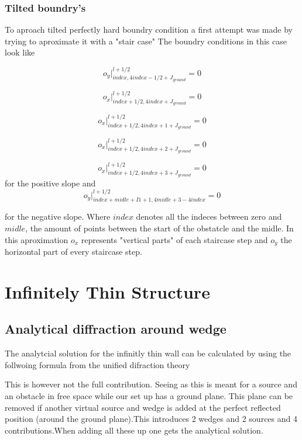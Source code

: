 \documentclass{article}
\begin{document}
\subsubsection{Tilted boundry's}

To aproach tilted perfectly hard boundry condition a first attempt was made by trying to aproximate it with a "stair case"
The boundry conditions in this case look like 

\begin{equation}
o_y|_{index,4index-1/2+J_{ground}}^{l+1/2}=0
\end{equation}

\begin{equation}
o_x|_{index+1/2,4index+J_{ground}}^{l+1/2}=0
\end{equation}

\begin{equation}
o_x|_{index+1/2,4index+1+J_{ground}}^{l+1/2}=0
\end{equation}

\begin{equation}
o_x|_{index+1/2,4index+2+J_{ground}}^{l+1/2}=0
\end{equation}

\begin{equation}
o_x|_{index+1/2,4index+3+J_{ground}}^{l+1/2}=0
\end{equation}
for the positive slope and 
\begin{equation}
    o_y|_{index+midle+I1+1,4midle+3-4index}^{l+1/2}=0
\end{equation}

for the negative slope. Where $index$ denotes all the indeces between zero and $midle$, the amount of points between the start of the obstatcle and the midle. In this aproximation $o_x$ represents "vertical parts" of each staircase step and $o_y$ the horizontal part of every staircase step.
\section{Infinitely Thin Structure}

\subsection{Analytical diffraction around wedge}
The analytcial solution for the infinitly thin wall can be calculated by using the follwoing formula from the unified difraction theory

\begin{equation}
    
\end{equation}
This is however not the full contribution. Seeing as this is meant for a source and an obstacle in free space while our set up has a ground plane. This plane can be removed if another virtual source and wedge is added at the perfect reflected position (around the ground plane).This introduces 2 wedges and 2 sources and 4 contributions.When adding all these up one gets the analytical solution.
\end{document}
